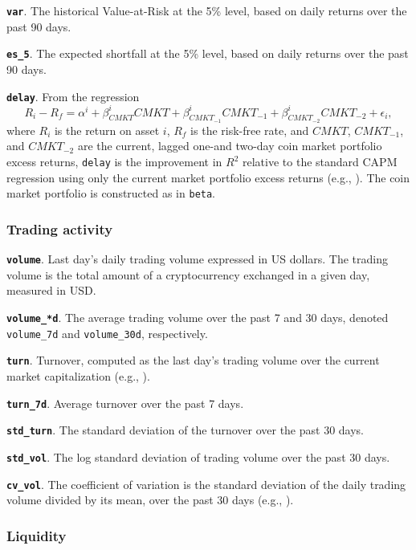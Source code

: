 \documentclass[
  12pt,
  a4paper,
  openany]{scrbook}
\begin{document}
\textbf{\texttt{var}}. The historical Value-at-Risk at the 5\% level,
based on daily returns over the past 90 days.

\textbf{\texttt{es\_5}}. The expected shortfall at the 5\% level, based
on daily returns over the past 90 days.

\textbf{\texttt{delay}}. From the regression \[
R_i - R_f = \alpha^i + \beta^i_{CMKT}CMKT + \beta^i_{CMKT_{-1}}CMKT_{-1} + \beta^i_{CMKT_{-2}}CMKT_{-2} + \epsilon_i, 
\] where \(R_i\) is the return on asset \(i\), \(R_f\) is the risk-free
rate, and \(CMKT\), \(CMKT_{-1}\), and \(CMKT_{-2}\) are the current,
lagged one-and two-day coin market portfolio excess returns,
\texttt{delay} is the improvement in \(R^2\) relative to the standard
CAPM regression using only the current market portfolio excess returns
(e.g., ).
The coin market portfolio is constructed as in \texttt{beta}.

\subsubsection{Trading activity}\label{trading-activity}

\textbf{\texttt{volume}}. Last day's daily trading volume expressed in
US dollars. The trading volume is the total amount of a cryptocurrency
exchanged in a given day, measured in USD.

\textbf{\texttt{volume\_*d}}. The average trading volume over the past 7
and 30 days, denoted \texttt{volume\_7d} and \texttt{volume\_30d},
respectively.

\textbf{\texttt{turn}}. Turnover, computed as the last day's trading
volume over the current market capitalization (e.g.,
).

\textbf{\texttt{turn\_7d}}. Average turnover over the past 7 days.

\textbf{\texttt{std\_turn}}. The standard deviation of the turnover over
the past 30 days.

\textbf{\texttt{std\_vol}}. The log standard deviation of trading volume
over the past 30 days.

\textbf{\texttt{cv\_vol}}. The coefficient of variation is the standard
deviation of the daily trading volume divided by its mean, over the past
30 days (e.g., ).

\subsubsection{Liquidity}\label{liquidity}
\end{document}
